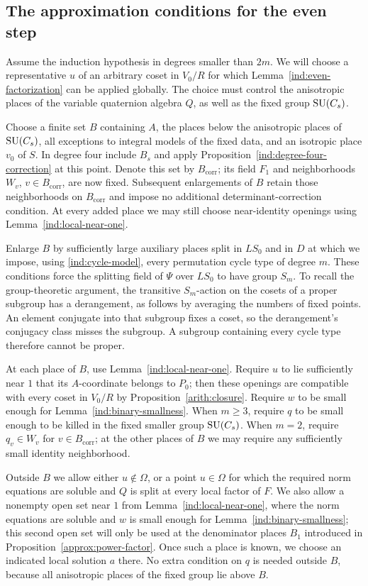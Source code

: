 \subsection{The approximation conditions for the even step}

Assume the induction hypothesis in degrees smaller than $2m$.  We will
choose a representative $u$ of an arbitrary coset in $V_0/R$ for which
Lemma~\ref{ind:even-factorization} can be applied globally.  The choice
must control the anisotropic places of the variable quaternion algebra
$Q$, as well as the fixed group $\operatorname{SU}(C_s)$.

Choose a finite set $B$ containing $A$, the places below the anisotropic
places of $\operatorname{SU}(C_s)$, all exceptions to integral models of the fixed
data, and an isotropic place $v_0$ of $S$.  In degree four include $B_s$
and apply Proposition~\ref{ind:degree-four-correction} at this point.
Denote this set by $B_{\mathrm{corr}}$; its field $F_1$ and neighborhoods
$W_v$, $v\in B_{\mathrm{corr}}$, are now fixed.  Subsequent enlargements
of $B$ retain those neighborhoods on $B_{\mathrm{corr}}$ and impose
no additional determinant-correction condition.  At every added place
we may still choose near-identity openings using
Lemma~\ref{ind:local-near-one}.

Enlarge $B$ by sufficiently large auxiliary places split in $LS_0$
and in $D$ at which we impose,
using \eqref{ind:cycle-model}, every permutation cycle type of degree
$m$.  These conditions force the splitting field of $\Psi$ over
$LS_0$ to have group $S_m$.  To recall the group-theoretic argument,
the transitive $S_m$-action on the cosets of a proper subgroup has
a derangement, as follows by averaging the numbers of fixed points.
An element conjugate into that subgroup fixes a coset, so the
derangement's conjugacy class misses the subgroup.  A subgroup
containing every cycle type therefore cannot be proper.

At each place of $B$, use Lemma~\ref{ind:local-near-one}.  Require $u$
to lie sufficiently near $1$ that its $A$-coordinate belongs to $P_0$;
then these openings are compatible with every coset in $V_0/R$ by
Proposition~\ref{arith:closure}.  Require $w$ to be small enough for
Lemma~\ref{ind:binary-smallness}.  When $m\geq3$, require $q$ to be
small enough to be killed in the fixed smaller group $\operatorname{SU}(C_s)$.
When $m=2$, require $q_v\in W_v$ for
$v\in B_{\mathrm{corr}}$; at the other places of $B$ we may require
any sufficiently small identity neighborhood.

Outside $B$ we allow either $u\notin\Omega$, or a point $u\in\Omega$
for which the required norm equations are soluble and $Q$ is split at
every local factor of $F$.  We also allow a nonempty open set near $1$
from Lemma~\ref{ind:local-near-one}, where the norm equations are
soluble and $w$ is small enough for
Lemma~\ref{ind:binary-smallness}; this second open set will only be used
at the denominator places $B_1$ introduced in
Proposition~\ref{approx:power-factor}.  Once such a place is known, we
choose an indicated local solution $a$ there.  No extra condition on
$q$ is needed outside $B$, because all anisotropic places of the fixed
group lie above $B$.

